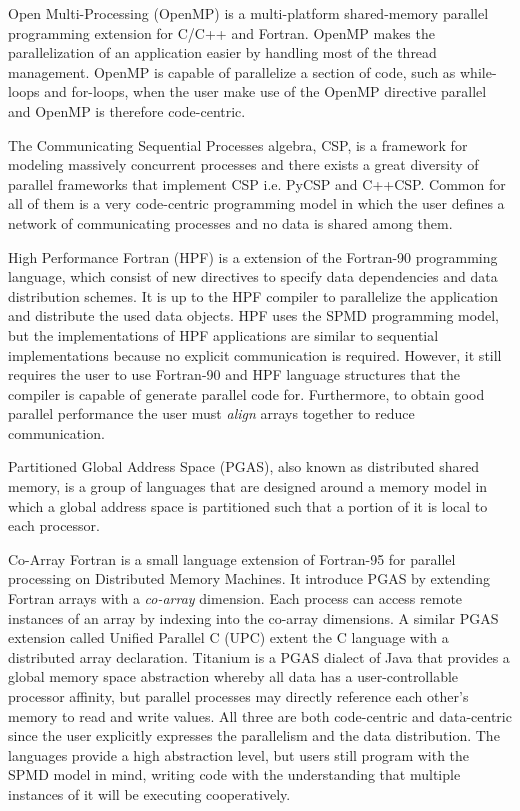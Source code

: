 \documentclass[preprint]{../PGAS10/sigplanconf}
\begin{document}
Open Multi-Processing (OpenMP)\cite{Dagum98} is a multi-platform shared-memory parallel programming extension for C/C++ and Fortran. OpenMP makes the parallelization of an application easier by handling most of the thread management. OpenMP is capable of parallelize a section of code, such as while-loops and for-loops, when the user make use of the OpenMP directive parallel and OpenMP is therefore code-centric.

The Communicating Sequential Processes algebra, CSP\cite{CSPHoare78}, is a framework for modeling massively concurrent processes and there exists a great diversity of parallel frameworks that implement CSP i.e. PyCSP\cite{PyCSP07} and C++CSP\cite{CSP_Brown03}. Common for all of them is a very code-centric programming model in which the user defines a network of communicating processes and no data is shared among them.


High Performance Fortran (HPF) \cite{Loveman93} is a extension of the Fortran-90\cite{adams1992fortran} programming language, which consist of new directives to specify data dependencies and data distribution schemes. It is up to the HPF compiler to parallelize the application and distribute the used data objects. HPF uses the SPMD programming model, but the implementations of HPF applications are similar to sequential implementations because no explicit communication is required. However, it still requires the user to use Fortran-90 and HPF language structures that the compiler is capable of generate parallel code for. Furthermore, to obtain good parallel performance the user must \emph{align} arrays together to reduce communication.


Partitioned Global Address Space (PGAS), also known as distributed shared memory, is a group of languages that are designed around a memory model in which a global address space is partitioned such that a portion of it is local to each processor.

Co-Array Fortran\cite{Co-arrayFortran98} is a small language extension of Fortran-95 for parallel processing on Distributed Memory Machines. It introduce PGAS by extending Fortran arrays with a \emph{co-array} dimension. Each process can access remote instances of an array by indexing into the co-array dimensions. A similar PGAS extension called Unified Parallel C (UPC)\cite{Carlson99_UPC} extent the C language with a distributed array declaration. Titanium\cite{Yelick1998_Titanium} is a PGAS dialect of Java that provides a global memory space abstraction whereby all data has a user-controllable processor affinity, but parallel processes may directly reference each other's memory to read and write values. All three are both code-centric and data-centric since the user explicitly expresses the parallelism and the data distribution. The languages provide a high abstraction level, but users still program with the SPMD model in mind, writing code with the understanding that multiple instances of it will be executing cooperatively.
\end{document}
